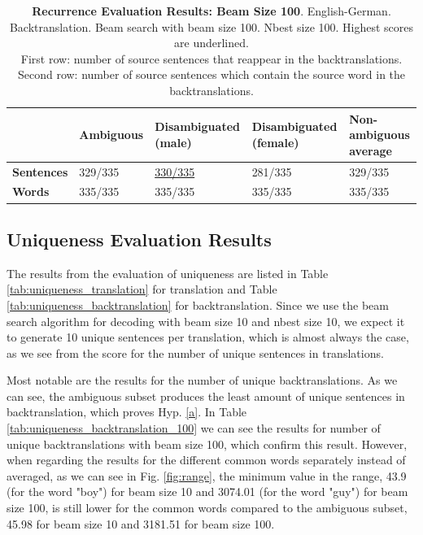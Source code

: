 \begin{table} 
    \begin{tabularx}{\linewidth}{|X|XXXX|}
        \hline
         & \textbf{Ambiguous} & \textbf{Disambiguated (male)} & \textbf{Disambiguated (female)} & \textbf{Non-ambiguous average} \\ \hline
         \textbf{Sentences} & 329/335 & \underline{330/335} & 281/335 & 329/335 \\ 
         \textbf{Words} & 335/335 & 335/335 & 335/335 & 335/335 \\ \hline
    \end{tabularx}
    \caption{\textbf{Recurrence Evaluation Results: Beam Size 100}. English-German. Backtranslation. Beam search with beam size 100. Nbest size 100. Highest scores are underlined. \\ First row: number of source sentences that reappear in the backtranslations. \\ Second row: number of source sentences which contain the source word in the backtranslations.}
    \label{tab:recurrence_100}
\end{table}

\subsection{Uniqueness Evaluation Results}
\label{ch:Base_Experiment:Results:Uniqueness}

The results from the evaluation of uniqueness are listed in Table \ref{tab:uniqueness_translation} for translation and Table \ref{tab:uniqueness_backtranslation} for backtranslation.
Since we use the beam search algorithm for decoding with beam size 10 and nbest size 10, we expect it to generate 10 unique sentences per translation, which is almost always the case, as we see from the score for the number of unique sentences in translations. 

Most notable are the results for the number of unique backtranslations. As we can see, the ambiguous subset produces the least amount of unique sentences in backtranslation, which proves Hyp. \ref{a}. In Table \ref{tab:uniqueness_backtranslation_100} we can see the results for number of unique backtranslations with beam size 100, which confirm this result. However, when regarding the results for the different common words separately instead of averaged, as we can see in Fig. \ref{fig:range}, the minimum value in the range, 43.9 (for the word "boy") for beam size 10 and 3074.01 (for the word "guy") for beam size 100, is still lower for the common words compared to the ambiguous subset, 45.98 for beam size 10 and 3181.51 for beam size 100.

